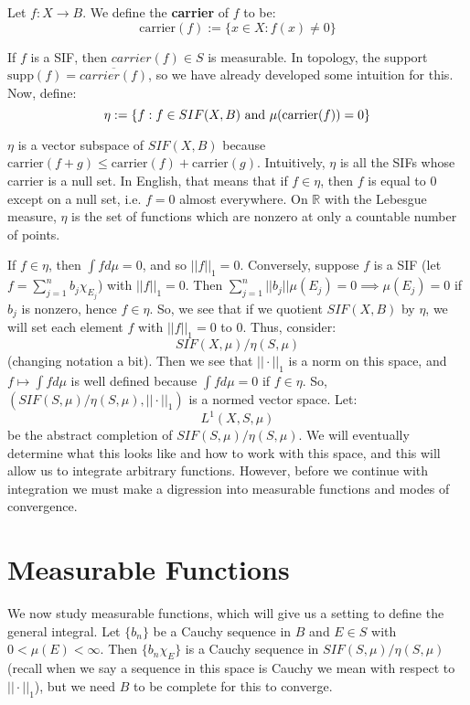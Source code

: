 	\begin{definition}[Carrier]
		Let $f : X\rightarrow B$. We define the \textbf{carrier} of $f$ to be:
		$$
			\mathrm{carrier}(f) := \{x\in X : f(x)\neq 0\}
		$$
	\end{definition}
	
	If $f$ is a SIF, then $carrier(f)\in S$ is measurable. In topology, the support $\mathrm{supp}(f) = \overline{carrier(f)}$, so we 
	have already developed some intuition for this. Now, define:
	$$
		\eta := \{f : f\in SIF(X, B)\textnormal{ and } \mu(\mathrm{carrier}(f)) = 0\}
	$$
	
	$\eta$ is a vector subspace of $SIF(X, B)$ because $\mathrm{carrier}(f + g)\leq \mathrm{carrier}(f) + \mathrm{carrier}(g)$. Intuitively, $\eta$ is 
	all the SIFs whose carrier is a null set. In English, that means that if $f\in\eta$, then $f$ is equal to $0$ except 
	on a null set, i.e. $f = 0$ almost everywhere. On $\mathbb R$ with the Lebesgue measure, $\eta$ is the set of functions 
	which are nonzero at only a countable number of points. 
	
	If $f\in\eta$, then $\int fd\mu = 0$, and so $||f||_1 = 0$. Conversely, suppose $f$ is a SIF (let $f = \sum_{j = 1}^n b_j
	\chi_{E_j}$) with $||f||_1 = 0$. Then $\sum_{j = 1}^n ||b_j||\mu(E_j) = 0\implies\mu(E_j) = 0$ if $b_j$ is nonzero, hence 
	$f\in\eta$. So, we see that if we quotient $SIF(X, B)$ by $\eta$, we will set each element $f$ with $||f||_1 = 0$ to $0$. 
	Thus, consider:
	$$
		SIF(X, \mu) / \eta(S, \mu)
	$$
	(changing notation a bit). Then we see that $||\cdot||_1$ is a norm on this space, and $f\mapsto\int fd\mu$ is 
	well defined because $\int fd\mu = 0$ if $f\in\eta$. So, $(SIF(S, \mu) / \eta(S, \mu), ||\cdot||_1)$ is a normed vector space.
	Let:
	$$
		L^1(X, S, \mu)
	$$
	be the abstract completion of $SIF(S, \mu) / \eta(S, \mu)$. We will eventually determine what this looks like and how to 
	work with this space, and this will allow us to integrate arbitrary functions. However, before we continue with integration 
	we must make a digression into measurable functions and modes of convergence. 
	
	\section{Measurable Functions}
	
	We now study measurable functions, which will give us a setting to define the general integral. Let $\{b_n\}$ be a 
	Cauchy sequence in $B$ and $E\in S$ with $0 < \mu(E) < \infty$. Then $\{b_n\chi_E\}$ is a Cauchy sequence in 
	$SIF(S, \mu) / \eta(S, \mu)$ (recall when we say a sequence in this space is Cauchy we mean with respect to 
	$||\cdot||_1$), but we need $B$ to be complete for this to converge. 
	
